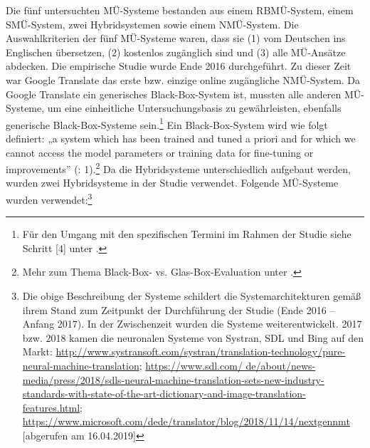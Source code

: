 Die fünf untersuchten MÜ-Systeme bestanden aus einem RBMÜ-System, einem SMÜ-System, zwei Hybridsystemen sowie einem NMÜ-System. Die Auswahlkriterien der fünf MÜ-Systeme waren, dass sie (1) vom Deutschen ins Englischen übersetzen, (2) kostenlos zugänglich sind und (3) alle MÜ-Ansätze abdecken. Die empirische Studie wurde Ende 2016 durchgeführt. Zu dieser Zeit war Google Translate das erste bzw. einzige online zugängliche NMÜ-System. Da Google Translate ein generisches Black-Box-System ist, mussten alle anderen MÜ-Systeme, um eine einheitliche Untersuchungsbasis zu gewährleisten, ebenfalls generische Black-Box-Systeme sein.\footnote{{Für den Umgang mit den spezifischen Termini im Rahmen der Studie siehe Schritt [4] unter .} } Ein Black-Box-System wird wie folgt definiert: „a system which has been trained and tuned a priori and for which we cannot access the model parameters or training data for fine-tuning or improvements” (\citealt{MehtaEtAl2020}: 1).\footnote{{Mehr zum Thema Black-Box- vs. Glas-Box-Evaluation unter .} } Da die Hybridsysteme unterschiedlich aufgebaut werden, wurden zwei Hybridsysteme in der Studie verwendet. Folgende MÜ-Systeme wurden verwendet:\footnote{Die obige Beschreibung der Systeme schildert die Systemarchitekturen gemäß ihrem Stand zum Zeitpunkt der Durchführung der Studie (Ende 2016 -- Anfang 2017). In der Zwischenzeit wurden die Systeme weiterentwickelt. 2017 bzw. 2018 kamen die neuronalen Systeme von Systran, SDL und Bing auf den Markt:
\url{http://www.systransoft.com/systran/translation-technology/pure-neural-machine-translation};
\url{https://www.sdl.com/ de/about/news-media/press/2018/sdls-neural-machine-translation-sets-new-industry-standards-with-state-of-the-art-dictionary-and-image-translation-features.html};
\url{https://www.microsoft.com/dede/translator/blog/2018/11/14/nextgennmt}
[abgerufen am 16.04.2019]}

